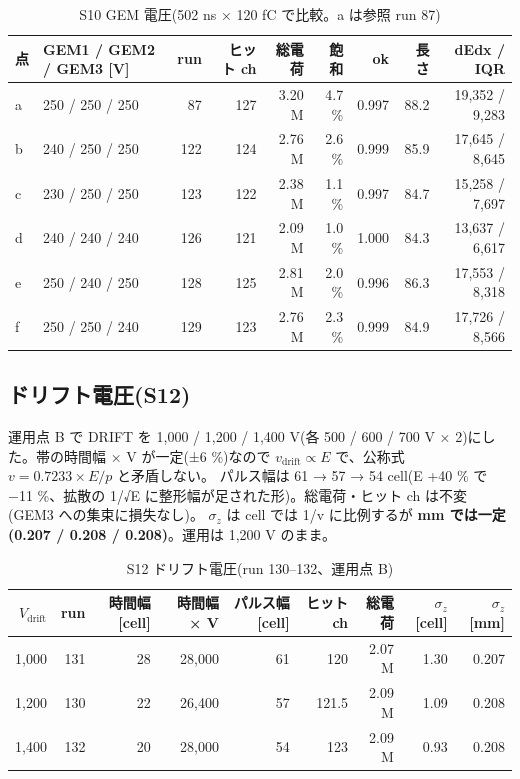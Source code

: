\documentclass[a4paper,11pt]{ltjsarticle}
\begin{document}
\begin{table}[H]\centering\small
\caption{S10 GEM 電圧(502 ns × 120 fC で比較。a は参照 run 87)}
\begin{tabular}{llrrrrrrr}
\toprule
点 & GEM1 / GEM2 / GEM3 [V] & run & ヒット ch & 総電荷 & 飽和 & ok & 長さ & dEdx / IQR \\
\midrule
a & 250 / 250 / 250 & 87 & 127 & 3.20 M & 4.7 \% & 0.997 & 88.2 & 19,352 / 9,283 \\
b & 240 / 250 / 250 & 122 & 124 & 2.76 M & 2.6 \% & 0.999 & 85.9 & 17,645 / 8,645 \\
c & 230 / 250 / 250 & 123 & 122 & 2.38 M & 1.1 \% & 0.997 & 84.7 & 15,258 / 7,697 \\
d & 240 / 240 / 240 & 126 & 121 & 2.09 M & 1.0 \% & 1.000 & 84.3 & 13,637 / 6,617 \\
e & 250 / 240 / 250 & 128 & 125 & 2.81 M & 2.0 \% & 0.996 & 86.3 & 17,553 / 8,318 \\
f & 250 / 250 / 240 & 129 & 123 & 2.76 M & 2.3 \% & 0.999 & 84.9 & 17,726 / 8,566 \\
\bottomrule
\end{tabular}
\end{table}

\subsection{ドリフト電圧(S12)}
運用点 B で DRIFT を 1,000 / 1,200 / 1,400 V(各 500 / 600 / 700 V × 2)にした。帯の時間幅 × V が一定(±6 \%)なので $v_\mathrm{drift} \propto E$ で、公称式 $v = 0.7233 \times E/p$ と矛盾しない。
パルス幅は 61 → 57 → 54 cell(E +40 \% で −11 \%、拡散の 1/√E に整形幅が足された形)。総電荷・ヒット ch は不変(GEM3 への集束に損失なし)。
$\sigma_z$ は cell では 1/v に比例するが \textbf{mm では一定(0.207 / 0.208 / 0.208)}。運用は 1,200 V のまま。

\begin{table}[H]\centering\small
\caption{S12 ドリフト電圧(run 130--132、運用点 B)}
\begin{tabular}{rrrrrrrrr}
\toprule
$V_\mathrm{drift}$ & run & 時間幅 [cell] & 時間幅 × V & パルス幅 [cell] & ヒット ch & 総電荷 & $\sigma_z$ [cell] & $\sigma_z$ [mm] \\
\midrule
1,000 & 131 & 28 & 28,000 & 61 & 120 & 2.07 M & 1.30 & 0.207 \\
1,200 & 130 & 22 & 26,400 & 57 & 121.5 & 2.09 M & 1.09 & 0.208 \\
1,400 & 132 & 20 & 28,000 & 54 & 123 & 2.09 M & 0.93 & 0.208 \\
\bottomrule
\end{tabular}
\end{table}
\end{document}
